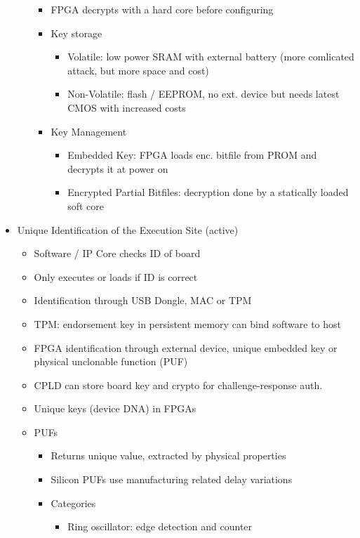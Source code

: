 \documentclass[11pt, paper=a4, twocolumn]{scrartcl}
\begin{document}
\begin{itemize}
\begin{itemize}
\begin{itemize}
							\item FPGA decrypts with a hard core before configuring
							\item Key storage
								\begin{itemize}
									\item Volatile: low power SRAM with external battery (more comlicated attack, 
										but more space and cost)
									\item Non-Volatile: flash / EEPROM, no ext. device but needs latest CMOS with 
										increased costs
								\end{itemize}
							\item Key Management
								\begin{itemize}
									\item Embedded Key: FPGA loads enc. bitfile from PROM and decrypts it at power on
									\item Encrypted Partial Bitfiles: decryption done by a statically loaded soft 
										core
								\end{itemize}
						\end{itemize}
				\end{itemize}
			\item Unique Identification of the Execution Site (active)
				\begin{itemize}
					\item Software / IP Core checks ID of board
					\item Only executes or loads if ID is correct
					\item Identification through USB Dongle, MAC or TPM
					\item TPM: endorsement key in persistent memory can bind software to host
					\item FPGA identification through external device, unique embedded key or physical unclonable function (PUF)
					\item CPLD can store board key and crypto for challenge-response auth.
					\item Unique keys (device DNA) in FPGAs
					\item PUFs
						\begin{itemize}
							\item Returns unique value, extracted by physical properties
							\item Silicon PUFs use manufacturing related delay variations
							\item Categories
								\begin{itemize} 
									\item Ring oscillator: edge detection and counter

\end{itemize}
\end{itemize}
\end{itemize}
\end{itemize}
\end{document}
